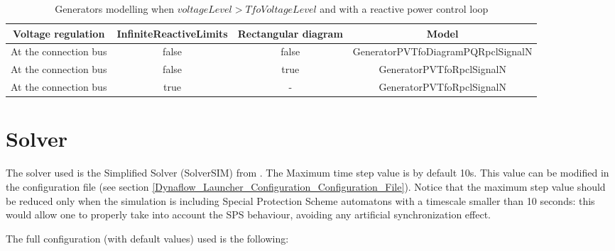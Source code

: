 \documentclass[a4paper, 12pt]{report}
\begin{document}
\begin{table}[h!]
\center
\begin{tabular}{ c | c | c | c}
\toprule
\scriptsize{\textbf{{Voltage regulation}}} & \scriptsize{\textbf{{InfiniteReactiveLimits}}} & \scriptsize{\textbf{{Rectangular diagram}}}  & \scriptsize{\textbf{{Model}}}\\
\midrule
\rowcolor{white}
 \scriptsize{At the connection bus} & \scriptsize{false} & \scriptsize{false} & \scriptsize{GeneratorPVTfoDiagramPQRpclSignalN} \\
\rowcolor{gray!10}
 \scriptsize{At the connection bus} & \scriptsize{false} & \scriptsize{true} & \scriptsize{GeneratorPVTfoRpclSignalN} \\
\rowcolor{white}
 \scriptsize{At the connection bus} & \scriptsize{true} & \scriptsize{-} & \scriptsize{GeneratorPVTfoRpclSignalN} \\
\bottomrule
\end{tabular}
\caption{Generators modelling when $voltageLevel > TfoVoltageLevel$ and with a reactive power control loop}
\label{tab:generators_modelling_tfo_rpcl}
\end{table}

\section{Solver}

The solver used is the Simplified Solver (SolverSIM) from \Dynawo.
The Maximum time step value is by default 10s. This value can be modified in the configuration file (see section \ref{Dynaflow_Launcher_Configuration_Configuration_File}).
Notice that the maximum step value should be reduced only when the simulation is including
Special Protection Scheme automatons with a timescale smaller than 10 seconds: this would allow one to properly
take into account the SPS behaviour, avoiding any artificial synchronization effect.

The full configuration (with default values) used is the following:


\end{document}
